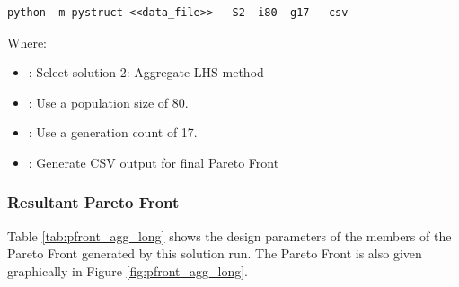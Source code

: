 \begin{verbatim}
python -m pystruct <<data_file>>  -S2 -i80 -g17 --csv
\end{verbatim}

\noindent Where: 

\begin{itemize}
  \item {}: Select solution 2: Aggregate LHS method
  \item {}: Use a population size of 80. 
  \item {}: Use a generation count of 17. 
  \item {}: Generate CSV output for final Pareto Front
\end{itemize}

\subsubsection{Resultant Pareto Front}
Table \ref{tab:pfront_agg_long} shows the design parameters of the members of the Pareto Front generated by this solution run. The Pareto Front is also given graphically in Figure \ref{fig:pfront_agg_long}. 
